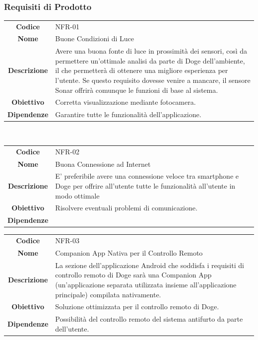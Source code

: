\documentclass{article}
\begin{document}
~

\subsubsection{Requisiti di Prodotto}

\begin{adjustbox}{center}
\begin{tabular}{|c|p{10cm}|}
\hline
\textbf{Codice} & NFR-01 \\
\textbf{Nome} & Buone Condizioni di Luce \\
\textbf{Descrizione} & Avere una buona fonte di luce in prossimità dei sensori, così da permettere un'ottimale analisi da parte di Doge dell'ambiente, il che permetterà di ottenere una migliore esperienza per l'utente. Se questo requisito dovesse venire a mancare, il sensore Sonar offrirà comunque le funzioni di base al sistema. \\
\textbf{Obiettivo} & Corretta visualizzazione mediante fotocamera. \\
\textbf{Dipendenze} & Garantire tutte le funzionalità dell'applicazione. \\
\hline
\end{tabular}
\end{adjustbox}

~

\begin{adjustbox}{center}
\begin{tabular}{|c|p{10cm}|}
\hline
\textbf{Codice} & NFR-02 \\
\textbf{Nome} & Buona Connessione ad Internet \\
\textbf{Descrizione} & E' preferibile avere una connessione veloce tra smartphone e Doge per offrire all'utente tutte le funzionalità all'utente in modo ottimale \\
\textbf{Obiettivo} & Risolvere eventuali problemi di comunicazione. \\
\textbf{Dipendenze} &  \\
\hline
\end{tabular}
\end{adjustbox}

\begin{adjustbox}{center}
\begin{tabular}{|c|p{10cm}|}
\hline
\textbf{Codice} & NFR-03 \\
\textbf{Nome} & Companion App Nativa per il Controllo Remoto \\
\textbf{Descrizione} & La sezione dell'applicazione Android che soddisfa i requisiti di controllo remoto di Doge sarà una Companion App (un'applicazione separata utilizzata insieme all'applicazione principale) compilata nativamente. \\
\textbf{Obiettivo} & Soluzione ottimizzata per il controllo remoto di Doge. \\
\textbf{Dipendenze} & Possibilità del controllo remoto del sistema antifurto da parte dell'utente. \\
\hline
\end{tabular}
\end{adjustbox}
\end{document}
